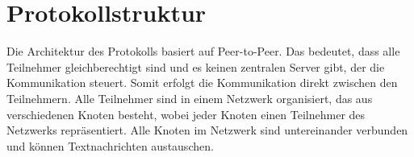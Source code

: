 \section{Protokollstruktur}
\label{sec:protokolldesign_und_struktur}




Die Architektur des Protokolls basiert auf Peer-to-Peer. Das bedeutet, dass alle Teilnehmer gleichberechtigt sind und es keinen zentralen Server gibt, der die Kommunikation steuert. Somit erfolgt die Kommunikation direkt zwischen den Teilnehmern. Alle Teilnehmer sind in einem Netzwerk organisiert, das aus verschiedenen Knoten besteht, wobei jeder Knoten einen Teilnehmer des Netzwerks repräsentiert. Alle Knoten im Netzwerk sind untereinander verbunden und können Textnachrichten austauschen.









%



%

%

%





